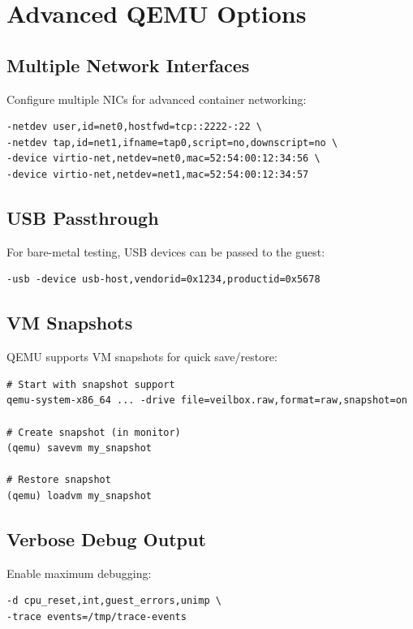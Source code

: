 \section{Advanced QEMU Options}

\subsection{Multiple Network Interfaces}

Configure multiple NICs for advanced container networking:

\begin{lstlisting}
-netdev user,id=net0,hostfwd=tcp::2222-:22 \
-netdev tap,id=net1,ifname=tap0,script=no,downscript=no \
-device virtio-net,netdev=net0,mac=52:54:00:12:34:56 \
-device virtio-net,netdev=net1,mac=52:54:00:12:34:57
\end{lstlisting}

\subsection{USB Passthrough}

For bare-metal testing, USB devices can be passed to the guest:

\begin{lstlisting}
-usb -device usb-host,vendorid=0x1234,productid=0x5678
\end{lstlisting}

\subsection{VM Snapshots}

QEMU supports VM snapshots for quick save/restore:

\begin{lstlisting}
# Start with snapshot support
qemu-system-x86_64 ... -drive file=veilbox.raw,format=raw,snapshot=on

# Create snapshot (in monitor)
(qemu) savevm my_snapshot

# Restore snapshot
(qemu) loadvm my_snapshot
\end{lstlisting}

\subsection{Verbose Debug Output}

Enable maximum debugging:

\begin{lstlisting}
-d cpu_reset,int,guest_errors,unimp \
-trace events=/tmp/trace-events
\end{lstlisting}

